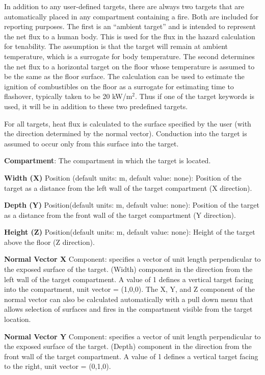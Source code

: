 In addition to any user-defined targets, there are always two targets that are automatically placed in any compartment containing a fire. Both are included for reporting purposes. The first is an “ambient target” and is intended to represent the net flux to a human body. This is used for the flux in the hazard calculation for tenability. The assumption is that the target will remain at ambient temperature, which is a surrogate for body temperature. The second determines the net flux to a horizontal target on the floor whose temperature is assumed to be the same as the floor surface. The calculation can be used to estimate the ignition of combustibles on the floor as a surrogate for estimating time to flashover, typically taken to be 20 kW/m$^2$. Thus if one of the target keywords is used, it will be in addition to these two predefined targets.

For all targets, heat flux is calculated to the surface specified by the user (with the direction determined by the normal vector). Conduction into the target is assumed to occur only from this surface into the target.


\textbf{Compartment}: The compartment in which the target is located.

\textbf{Width (X)} Position (default units: m, default value: none): Position of the target as a distance from the left wall of the target compartment (X direction).

\textbf{Depth (Y)} Position(default units: m, default value: none): Position of the target as a distance from the front wall of the target compartment (Y direction).

\textbf{Height (Z)} Position(default units: m, default value: none): Height of the target above the floor (Z direction).

\textbf{Normal Vector X} Component: specifies a vector of unit length perpendicular to the exposed surface of the target. (Width) component in the direction from the left wall of the target compartment. A value of 1 defines a vertical target facing into the compartment, unit vector = (1,0,0). The X, Y, and Z component of the normal vector can also be calculated automatically with a pull down menu that allows selection of surfaces and fires in the compartment visible from the target location.

\textbf{Normal Vector Y} Component: specifies a vector of unit length perpendicular to the exposed surface of the target. (Depth) component in the direction from the front wall of the target compartment. A value of 1 defines a vertical target facing to the right, unit vector = (0,1,0). 

